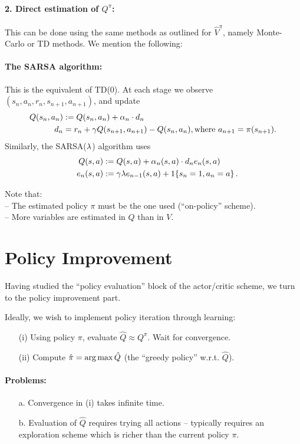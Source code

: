 \paragraph{2. Direct estimation of $Q^{\pi}$:}
This can be done using the same methods as outlined for $\hat V^{\pi}$,
namely Monte-Carlo or TD methods. We mention the following:

\paragraph{The SARSA algorithm:} This is the equivalent of TD(0).
At each stage we observe $(s_n,a_n,r_n,s_{n+1},a_{n+1})$, and update
\begin{align*}
Q(s_n, a_n) & := Q(s_n,a_n) + \alpha_n \cdot d_n \\
d_n & = r_n +  \gamma Q(s_{n+1}, a_{n+1}) - Q(s_n, a_n), \mbox{where } a_{n+1}=\pi(s_{n+1}).
\end{align*}
Similarly, the SARSA($\lambda$) algorithm uses
\begin{align*}
Q(s, a) & := Q(s,a) + \alpha_n(s,a) \cdot d_n e_n(s,a) \\
\quad e_n(s,a)& := \gamma \lambda e_{n-1}(s,a)+1\{s_n=1,a_n=a\} \,.
\end{align*}

Note that:\\
-- The estimated policy $\pi$ must be the one used (``on-policy'' scheme).\\
-- More variables are estimated in $Q$ than in $V$.




\section{Policy Improvement}

Having studied the ``policy evaluation'' block of the actor/critic scheme, we
turn to the policy improvement part.

Ideally, we wish to implement policy iteration through learning:
\begin{itemize} \negspace
\item[(i)]
Using policy $\pi$, evaluate $\hat Q \approx Q^{\pi}$.  Wait for convergence.
\item[(ii)]
Compute $\hat \pi = \argmax \hat Q$ (the ``greedy policy'' w.r.t. $\hat Q$).
\end{itemize}

\paragraph{Problems:}
\begin{itemize}
\item[a.]
Convergence in (i) takes infinite time.
\item[b.]
Evaluation of $\hat Q$ requires trying all actions -- typically requires
an exploration scheme which is richer than the current policy $\pi$.
\end{itemize}

